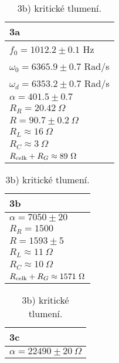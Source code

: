 \documentclass[a4paper,11pt]{article}
\begin{document}
\begin{table}[htpb]
    \hfill
    \begin{minipage}[b]{.25\linewidth}
        \centering
        \begin{tabular}{l}
            \hline \hline
            3a\\
            \hline
            $f_0 = 1012.2 \pm 0.1$ Hz\\
            $\omega_0 = 6365.9 \pm 0.7$ Rad/s\\
            $\omega_d=6353.2 \pm 0.7$ Rad/s\\
            $\alpha=401.5 \pm 0.7$\\
            $R_R=20.42\ \Omega$\\
            $R=90.7 \pm 0.2\ \Omega$\\
            $ R_L \approx 16\ \Omega $ \\
            $ R_C \approx 3\ \Omega $ \\
            $R_{\rm celk}+R_G \approx 89 \ \Omega $\\
            \hline \hline
        \end{tabular}
        \captionsetup{labelformat=empty}
        \caption{3a) podkritické tlumení}
    \end{minipage}%
    \hfill
    \begin{minipage}[b]{.25\linewidth}
        \centering
        \begin{tabular}{l}
            \hline \hline
            3b\\
            \hline
            $ \alpha = 7050 \pm 20$ \\
            $R_R=1500$\\
            $R=1593 \pm 5$\\
            $ R_L \approx 11\ \Omega $ \\
            $ R_C \approx 10\ \Omega $ \\
            $R_{\rm celk}+R_G \approx 1571\ \Omega$\\
            \hline \hline
        \end{tabular}
        \captionsetup{labelformat=empty}
        \caption{3b) kritické tlumení.}
    \end{minipage}
    \hfill
    \begin{minipage}[b]{.25\linewidth}
        \centering
        \begin{tabular}{l}
            \hline \hline
            3c\\
            \hline
            $\alpha = 22490 \pm 20\ \Omega$\\

\end{tabular}
\end{minipage}
\end{table}
\end{document}
